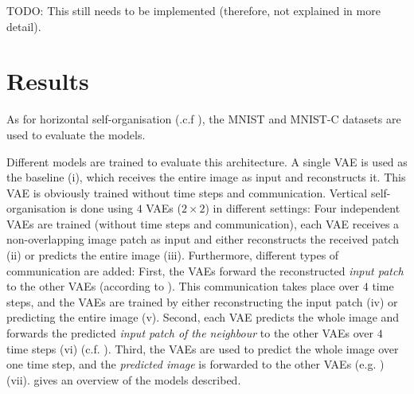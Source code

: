 TODO: This still needs to be implemented (therefore, not explained in more detail).


\section{Results}
As for horizontal self-organisation (.c.f ), the MNIST \cite{Lecun_Bottou_Bengio_Haffner_1998} and MNIST-C \cite{Mu_Gilmer_2019} datasets are used to evaluate the models. 

Different models are trained to evaluate this architecture. A single VAE is used as the baseline (i), which receives the entire image as input and reconstructs it. This VAE is obviously trained without time steps and communication. Vertical self-organisation is done using $4$ VAEs ($2\times 2$) in different settings: Four independent VAEs are trained (without time steps and communication), each VAE receives a non-overlapping image patch as input and either reconstructs the received patch (ii) or predicts the entire image (iii). Furthermore, different types of communication are added: First, the VAEs forward the reconstructed \emph{input patch} to the other VAEs (according to ). This communication takes place over $4$ time steps, and the VAEs are trained by either reconstructing the input patch (iv) or predicting the entire image (v). Second, each VAE predicts the whole image and forwards the predicted \emph{input patch of the neighbour} to the other VAEs over $4$ time steps  (vi) (c.f. ). Third, the VAEs are used to predict the whole image over one time step, and the \emph{predicted image} is forwarded to the other VAEs (e.g. ) (vii).  gives an overview of the models described.


